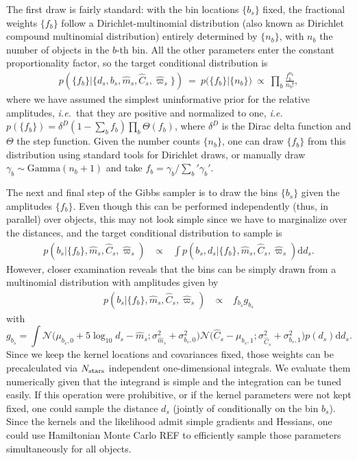 \documentclass[manuscript, letterpaper]{aastex6}
\newcommand{\ie}{{\textit{i.e.}~}}
\newcommand{\equ}[1]{\begin{equation}#1\end{equation}}
\newcommand{\eqn}[1]{\begin{eqnarray}#1\end{eqnarray}}
\newcommand{\nobj}{{N_{\rm stars}}}
\begin{document}
The first draw is fairly standard: with the bin locations $\{b_s\}$ fixed, the fractional weights $\{ f_{b} \}$ follow a Dirichlet-multinomial distribution (also known as Dirichlet compound multinomial distribution) entirely determined by $\{n_b \}$, with $n_b$ the number of objects in the $b$-th bin.
All the other parameters enter the constant proportionality factor, so the target conditional distribution is
\eqn{
	p\left(\bigl\{ f_b \bigr\} \bigr\rvert \bigl\{ d_s, b_s, \hat{m}_s, \hat{C}_s, \hat{\varpi}_s \bigr\} \right) \ = \ p\bigl( \bigl\{ f_b \bigr\} \bigr\rvert \{n_b \} \bigr) \ \propto\  \prod_b \frac{ f_b^{n_b} }{n_b !},
}
where we have assumed the simplest uninformative prior for the relative amplitudes, \ie that they are positive and normalized to one, \ie $p(\bigl\{ f_b \bigr\}) = \delta^D(1 - \sum_b f_b) \prod_b \Theta(f_b)$, where $\delta^D$ is the Dirac delta function and $\Theta$ the step function.
Given the number counts $\{n_b \}$, one can draw $\{ f_b \}$ from this distribution using standard tools for Dirichlet draws, or manually draw $\gamma_b \sim \mathrm{Gamma}(n_b + 1)$ and take $f_b = \gamma_b / \sum_b' \gamma_b'$.

The next and final step of the Gibbs sampler is to draw the bins $\{b_s\}$ given the amplitudes $\{f_b\}$. 
Even though this can be performed independently (thus, in parallel) over objects, this may not look simple since we have to marginalize over the distances, and the target conditional distribution to sample is
\eqn{
	p\left(b_s \bigr\rvert \bigl\{ f_b \bigr\}, \hat{m}_s, \hat{C}_s, \hat{\varpi}_s\right) \ &\propto& \  \int p\left(b_s, d_s \bigr\rvert \bigl\{ f_b \bigr\}, \hat{m}_s, \hat{C}_s, \hat{\varpi}_s\right)  \mathrm{d} d_s.
}  
However, closer examination reveals that the bins can be simply drawn from a multinomial distribution with amplitudes given by
\eqn{
	p\left(b_s \bigr\rvert \bigl\{ f_b \bigr\}, \hat{m}_s, \hat{C}_s, \hat{\varpi}_s\right) \ &\propto& \ f_{b_s}  g_{b_s}
} 
with
\equ{
	g_{b_s} = \int \mathcal{N}\bigl( \mu_{b_s,0} + 5\log_{10}d_s  -\hat{m}_s ;\sigma_{\hat{m}_s}^2 + \sigma_{b_s,0}^2 \bigr)   \mathcal{N}\bigl(\hat{C}_s - \mu_{b_s,1};\sigma_{\hat{C}_s}^2 + \sigma_{b_s,1}^2 \bigr) p(d_s)  \mathrm{d}  d_s.
}
Since we keep the kernel locations and covariances fixed, those weights can be precalculated via $\nobj$ independent one-dimensional integrals.
We evaluate them numerically given that the integrand is simple and the integration can be tuned easily. 
If this operation were prohibitive, or if the kernel parameters were not kept fixed, one could sample the distance $d_s$ (jointly of conditionally on the bin $b_s$).
Since the kernels and the likelihood admit simple gradients and Hessians, one could use Hamiltonian Monte Carlo REF to efficiently sample those parameters simultaneously for all objects.
\end{document}
